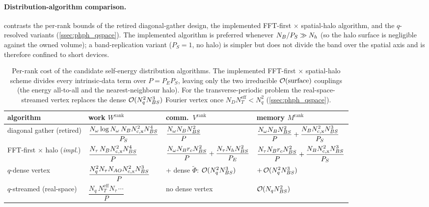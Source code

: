 \paragraph{Distribution-algorithm comparison.}
 contrasts the per-rank bounds of the retired
diagonal-gather design, the implemented FFT-first $\times$ spatial-halo
algorithm, and the $q$-resolved variants (\cref{ssec:phph_qspace}).
The implemented algorithm is preferred whenever
$N_{B}/P_S \gg N_h$ (so the halo surface is negligible against the
owned volume); a band-replication variant ($P_S=1$, no halo) is
simpler but does not divide the band over the spatial axis and is
therefore confined to short devices.
\begin{table}[htb]
  \centering
  \small
  \begin{tabular}{@{}llll@{}}
    \toprule
    algorithm & work $W^\mathrm{rank}$ & comm.\ $V^\mathrm{rank}$ & memory $M^\mathrm{rank}$ \\
    \midrule
    diagonal gather (retired)
      & $\dfrac{N_\omega\log N_\omega\,N_{B} N_\mathrm{c,x}^{2}N_{BS}^{4}}{P_S}$
      & $\dfrac{N_\omega N_{B}N_{BS}^{2}}{P}$
      & $\dfrac{N_\omega N_{B}N_{BS}^{2}}{P}+\dfrac{N_{B} N_\mathrm{c,x}^{2}N_{BS}^{3}}{P_S}$ \\[1.4ex]
    FFT-first $\times$ halo (\emph{impl.})
      & $\dfrac{N_\tau\,N_{B} N_\mathrm{c,x}^{2}N_{BS}^{4}}{P}$
      & $\dfrac{N_\omega N_{B} r_cN_{BS}^{2}}{P}+\dfrac{N_\tau N_hN_{BS}^{2}}{P_E}$
      & $\dfrac{N_\tau N_{B} r_cN_{BS}^{2}}{P}+\dfrac{N_{B} N_\mathrm{c,x}^{2}N_{BS}^{3}}{P_S}$ \\[1.4ex]
    $q$-dense vertex
      & $\dfrac{N_q^{2}N_\tau N_{AO}N_\mathrm{c,x}^{2}N_{BS}^{3}}{P}$
      & + dense $\tilde\Phi$: $\mathcal{O}(N_q^{2}N_{BS}^{3})$
      & $+\,\mathcal{O}(N_q^{2}N_{BS}^{3})$ \\[1.0ex]
    $q$-streamed (real-space)
      & $\dfrac{N_q\,N_T^{\mathrm{eff}}N_\tau\,\cdots}{P}$
      & no dense vertex
      & $\mathcal{O}(N_qN_{BS}^{2})$ \\
    \bottomrule
  \end{tabular}
  \caption{Per-rank cost of the candidate self-energy distribution
  algorithms. The implemented FFT-first $\times$ spatial-halo scheme
  divides every intrinsic-data term over $P=P_EP_S$, leaving only the
  two irreducible $\mathcal{O}(\text{surface})$ couplings (the energy
  all-to-all and the nearest-neighbour halo). For the transverse-periodic
  problem the real-space-streamed vertex replaces the dense
  $\mathcal{O}(N_q^{2}N_{BS}^{3})$ Fourier vertex once $N_D N_T^{\mathrm{eff}}<N_q^{2}$
  (\cref{ssec:phph_qspace}).}
  \label{tab:phph_dist}
\end{table}


